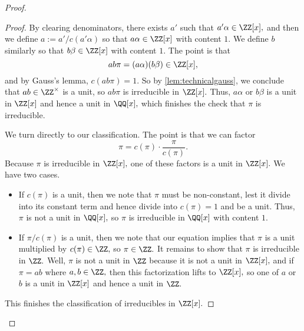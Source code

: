 \begin{proof}
\begin{proof}
		By clearing denominators, there exists $a'$ such that $a'\alpha\in\ZZ[x],$ and then we define $a:=a'/c(a'\alpha)$ so that $a\alpha\in\ZZ[x]$ with content $1.$ We define $b$ similarly so that $b\beta\in\ZZ[x]$ with content $1.$ The point is that
		\[ab\pi=(a\alpha)(b\beta)\in\ZZ[x],\]
		and by Gauss's lemma, $c(ab\pi)=1.$ So by \autoref{lem:technicalgauss}, we conclude that $ab\in\ZZ^\times$ is a unit, so $ab\pi$ is irreducible in $\ZZ[x].$ Thus, $a\alpha$ or $b\beta$ is a unit in $\ZZ[x]$ and hence a unit in $\QQ[x],$ which finishes the check that $\pi$ is irreducible.
		
		We turn directly to our classification. The point is that we can factor
		\[\pi=c(\pi)\cdot\frac{\pi}{c(\pi)}.\]
		Because $\pi$ is irreducible in $\ZZ[x],$ one of these factors is a unit in $\ZZ[x].$ We have two cases.
		\begin{itemize}
			\item If $c(\pi)$ is a unit, then we note that $\pi$ must be non-constant, lest it divide into its constant term and hence divide into $c(\pi)=1$ and be a unit. Thus, $\pi$ is not a unit in $\QQ[x],$ so $\pi$ is irreducible in $\QQ[x]$ with content $1.$
			\item If $\pi/c(\pi)$ is a unit, then we note that our equation implies that $\pi$ is a unit multiplied by $c(\pi)\in\ZZ,$ so $\pi\in\ZZ.$ It remains to show that $\pi$ is irreducible in $\ZZ.$ Well, $\pi$ is not a unit in $\ZZ$ because it is not a unit in $\ZZ[x],$ and if $\pi=ab$ where $a,b\in\ZZ,$ then this factorization lifts to $\ZZ[x],$ so one of $a$ or $b$ is a unit in $\ZZ[x]$ and hence a unit in $\ZZ.$
		\end{itemize}
		This finishes the classification of irreducibles in $\ZZ[x].$


\end{proof}
\end{proof}
